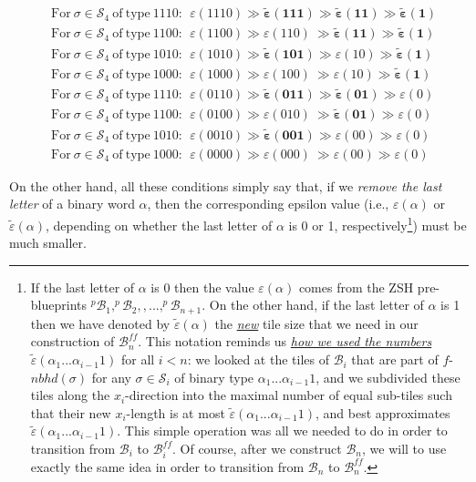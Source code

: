 \documentclass[12pt,letterpaper]{article}
\renewcommand{\S}{\mathcal{S}}
\newcommand{\B}{\mathcal{B}}
\newcommand{\eps}{\varepsilon}
\newcommand{\et}{\tilde\eps}
\newcommand{\nbhd}{\mathit{nbhd}}
\renewcommand{\a}{\alpha}
\begin{document}
\begin{align}
\label{additional_eps_conditions_in_3D}
& \mathrm{For} \  \sigma \in \S_4 \  \mathrm{of \ type} \ 1110:  \ \      
\eps(1110)    \gg   \boldsymbol{\et(111)}   \gg   \boldsymbol{\et(11)}      \gg   \boldsymbol{\et(1)} 
\\ \nonumber
& \mathrm{For} \  \sigma \in \S_4 \  \mathrm{of \ type} \ 1100:  \ \      
\eps(1100)    \gg     \eps(110)                \     \gg   \boldsymbol{\et(11)}    \gg   \boldsymbol{\et(1)} 
\\ \nonumber
& \mathrm{For} \  \sigma \in \S_4 \  \mathrm{of \ type} \ 1010:  \ \      
\eps(1010)    \gg  \boldsymbol{\et(101)}   \gg             \eps(10)               \gg   \boldsymbol{\et(1)} 
\\ \nonumber
& \mathrm{For} \  \sigma \in \S_4 \  \mathrm{of \ type} \ 1000:  \ \      
\eps(1000)    \gg     \eps(100)               \     \gg           \eps(10)               \gg   \boldsymbol{\et(1)} 
\\ \nonumber
& \mathrm{For} \  \sigma \in \S_4 \  \mathrm{of \ type} \ 1110:  \ \      
\eps(0110)    \gg   \boldsymbol{\et(011)}   \gg   \boldsymbol{\et(01)}      \gg    \eps(0)  
\\ \nonumber
& \mathrm{For} \  \sigma \in \S_4 \  \mathrm{of \ type} \ 1100:  \ \      
\eps(0100)    \gg     \eps(010)                \     \gg   \boldsymbol{\et(01)}    \gg    \eps(0)  
\\ \nonumber
& \mathrm{For} \  \sigma \in \S_4 \  \mathrm{of \ type} \ 1010:  \ \      
\eps(0010)    \gg  \boldsymbol{\et(001)}   \gg             \eps(00)               \gg     \eps(0)  
\\ \nonumber
& \mathrm{For} \  \sigma \in \S_4 \  \mathrm{of \ type} \ 1000:  \ \      
\eps(0000)    \gg     \eps(000)               \     \gg           \eps(00)               \gg    \eps(0)   
\end{align}
%

\smallskip

\noindent
On the other hand, all these conditions simply say that, if we {\em remove the last letter} of a binary word $\a$, then the corresponding epsilon value (i.e., $\eps(\a)$ or $\et(\a)$, depending on whether the last letter of $\a$ is 0 or 1, respectively\footnote{If the last letter of $\a$ is 0 then the value $\eps(\a)$ comes from the ZSH pre-blueprints $^p\!\B_1, ^p\!\B_2, ,..., ^p\!\B_{n+1}$. On the other hand, if the last letter of $\a$ is 1 then we have denoted by $\et(\a)$ the \ul{\em new} tile size that we need in our construction of $\B_n^\mathit{ff}$. This notation reminds us \ul{\em how we used the numbers $\et(\a_1...\a_{i-1} 1)$} for all $i < n$: we  looked at the tiles of $\B_i$ that are part of  $f$-$\nbhd(\sigma)$ for any $\sigma \in \S_i$ of binary type  $\a_1...\a_{i-1} 1$, and we subdivided these tiles along the $x_i$-direction into the maximal number of equal  sub-tiles such that their new $x_i$-length is at most $\et(\a_1...\a_{i-1} 1)$, and best approximates  $\et(\a_1...\a_{i-1} 1)$. This simple operation was all we needed to do in order  to transition from $\B_i$ to  $\B_i^\mathit{ff}$. Of course, after we construct  $\B_n$, we will to use exactly the same idea in order to transition from $\B_n$ to  $\B_n^\mathit{ff}$.}) must be much smaller. 
\end{document}
